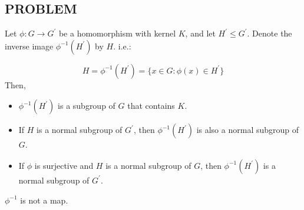 \documentclass[
]{book}
\providecommand{\tightlist}{%
  \setlength{\itemsep}{0pt}\setlength{\parskip}{0pt}}
\begin{document}
\hypertarget{problem}{%
\subsection{PROBLEM}\label{problem}}

\leavevmode{}%
Let \(\phi:G \to G^{\prime}\) be a homomorphism with kernel \(K\), and
let \(H^\prime\leq G^\prime\). Denote the inverse image
\(\phi^{-1}(H^\prime)\) by \(H\). i.e.:

\[H=\phi^{-1}(H^\prime)=\{x\in G: \phi(x)\in H^\prime\}\] Then,

\begin{itemize}
\tightlist
\item
  \(\phi^{-1}(H^\prime)\) is a subgroup of \(G\) that contains \(K\).
\item
  If \(H\) is a normal subgroup of \(G^\prime\), then
  \(\phi^{-1}(H^\prime)\) is also a normal subgroup of \(G\).
\item
  If \(\phi\) is surjective and \(H\) is a normal subgroup of \(G\),
  then \(\phi^{-1}(H^\prime)\) is a normal subgroup of \(G^\prime\).
\end{itemize}

\(\phi^{-1}\) is not a map.
\end{document}
